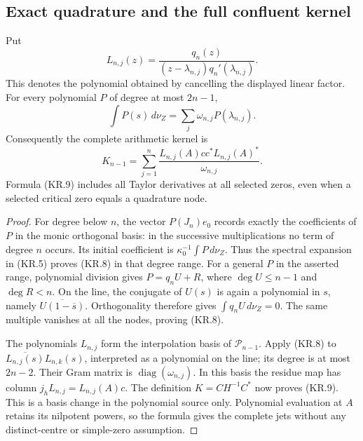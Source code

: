 \subsection{Exact quadrature and the full confluent kernel}

\begin{theorem}
Put
\[
 L_{n,j}(z)=\frac{q_n(z)}{(z-\lambda_{n,j})q_n'(\lambda_{n,j})}.
                                                                    \tag{KR.7}
\]
This denotes the polynomial obtained by cancelling the displayed
linear factor.  For every polynomial \(P\) of degree at most
\(2n-1\),
\[
 \int P(s)\,d\nu_Z=\sum_j\omega_{n,j}P(\lambda_{n,j}).     \tag{KR.8}
\]
Consequently the complete arithmetic kernel is
\[
 \boxed{K_{n-1}
   =\sum_{j=1}^n\frac{L_{n,j}(A)cc^*L_{n,j}(A)^*}
                           {\omega_{n,j}}.}             \tag{KR.9}
\]
Formula (KR.9) includes all Taylor derivatives at all selected
zeros, even when a selected critical zero equals a quadrature node.
\end{theorem}

\begin{proof}
For degree below \(n\), the vector \(P(J_n)e_0\) records exactly
the coefficients of \(P\) in the monic orthogonal basis: in the
successive multiplications no term of degree \(n\) occurs.
Its initial coefficient is \(\kappa_0^{-1}\int P\,d\nu_Z\).
Thus the spectral expansion in (KR.5) proves (KR.8) in that degree
range.  For a general \(P\) in the asserted range, polynomial
division gives \(P=q_nU+R\), where \(\deg U\leq n-1\) and
\(\deg R<n\).  On the line, the conjugate of \(U(s)\) is again a
polynomial in \(s\), namely \(\overline{U(1-\overline s)}\).
Orthogonality therefore gives \(\int q_nU\,d\nu_Z=0\).
The same multiple vanishes at all the nodes, proving (KR.8).

The polynomials \(L_{n,j}\) form the interpolation basis of
\(\mathcal P_{n-1}\).  Apply (KR.8) to
\(\overline{L_{n,j}(s)}L_{n,k}(s)\), interpreted as a polynomial
on the line; its degree is at most \(2n-2\).  Their Gram matrix is
\(\operatorname{diag}(\omega_{n,j})\).  In this basis the residue
map has column \(j_hL_{n,j}=L_{n,j}(A)c\).  The definition
\(K=C H^{-1}C^*\) now proves (KR.9).  This is a basis change in
the polynomial source only.  Polynomial evaluation at \(A\)
retains its nilpotent powers, so the formula gives the complete
jets without any distinct-centre or simple-zero assumption.
\end{proof}

